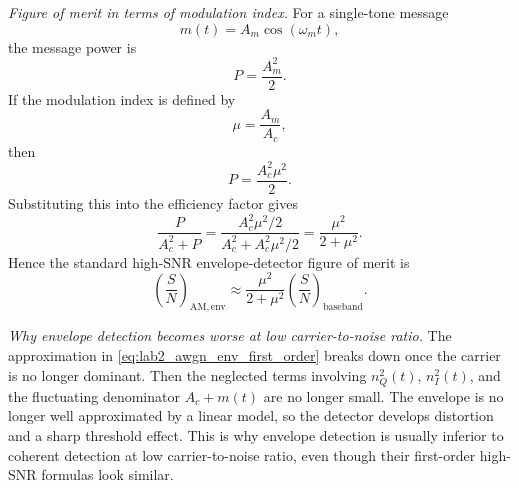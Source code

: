\begin{tcolorbox}[breakable, colback=cyan!4!white, colframe=cyan!60!black,
title={\textbf{Intuition: Step-by-Step Output SNR Models Under AWGN}}]
\emph{Figure of merit in terms of modulation index.}
For a single-tone message
\begin{equation}
m(t)=A_m\cos(\omega_m t),
\end{equation}
the message power is
\begin{equation}
P=\frac{A_m^2}{2}.
\end{equation}
If the modulation index is defined by
\begin{equation}
\mu=\frac{A_m}{A_c},
\end{equation}
then
\begin{equation}
P=\frac{A_c^2\mu^2}{2}.
\end{equation}
Substituting this into the efficiency factor gives
\begin{equation}
\frac{P}{A_c^2+P}
=
\frac{A_c^2\mu^2/2}{A_c^2+A_c^2\mu^2/2}
=
\frac{\mu^2}{2+\mu^2}.
\end{equation}
Hence the standard high-SNR envelope-detector figure of merit is
\begin{equation}
\left(\frac{S}{N}\right)_{\mathrm{AM,env}}
\approx
\frac{\mu^2}{2+\mu^2}
\left(\frac{S}{N}\right)_{\mathrm{baseband}}.
\end{equation}

\emph{Why envelope detection becomes worse at low carrier-to-noise ratio.}
The approximation in \eqref{eq:lab2_awgn_env_first_order} breaks down once the
carrier is no longer dominant. Then the neglected terms involving $n_Q^2(t)$,
$n_I^2(t)$, and the fluctuating denominator $A_c+m(t)$ are no longer small.
The envelope is no longer well approximated by a linear model, so the detector
develops distortion and a sharp threshold effect. This is why envelope detection
is usually inferior to coherent detection at low carrier-to-noise ratio, even
though their first-order high-SNR formulas look similar.
\end{tcolorbox}

